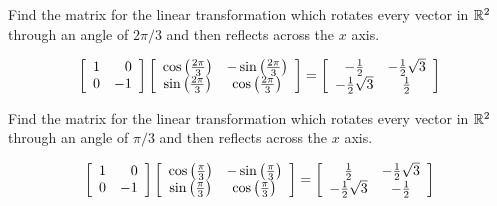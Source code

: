 \begin{enumialphparenastyle}
\begin{ex} Find the matrix for the linear transformation which rotates every
vector in $\mathbb{R}^{2}$ through an angle of $2\pi /3$ and then reflects
across the $x$ axis.
\begin{sol}
\[
\left[
\begin{array}{rr}
1 & 0 \\
0 & -1
\end{array}
\right] \left[
\begin{array}{cc}
\cos \left( \frac{2\pi }{3}\right)  & -\sin \left( \frac{2\pi }{3}\right)
\\
\sin \left( \frac{2\pi }{3}\right)  & \cos \left( \frac{2\pi }{3}\right)
\end{array}
\right] = \left[
\begin{array}{cc}
-\frac{1}{2} & -\frac{1}{2}\sqrt{3} \\
-\frac{1}{2}\sqrt{3} & \frac{1}{2}
\end{array}
\right]
\]
\end{sol}
\end{ex}

\begin{ex} Find the matrix for the linear transformation which rotates every
vector in $\mathbb{R}^{2}$ through an angle of $\pi /3$ and then reflects
across the $x$ axis.
\begin{sol}
\[
\left[
\begin{array}{rr}
1 & 0 \\
0 & -1
\end{array}
\right] \left[
\begin{array}{cc}
\cos \left( \frac{\pi }{3}\right)  & -\sin \left( \frac{\pi }{3}\right)  \\
\sin \left( \frac{\pi }{3}\right)  & \cos \left( \frac{\pi }{3}\right)
\end{array}
\right] = \left[
\begin{array}{cc}
\frac{1}{2} & -\frac{1}{2}\sqrt{3} \\
-\frac{1}{2}\sqrt{3} & -\frac{1}{2}
\end{array}
\right]
\]
\end{sol}
\end{ex}


\end{enumialphparenastyle}
